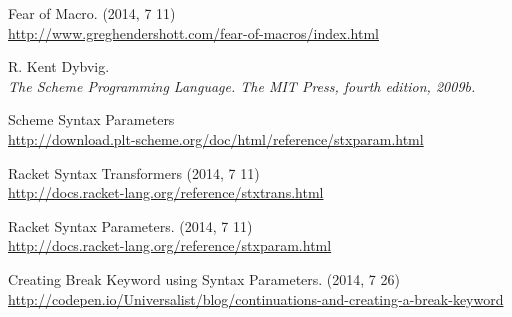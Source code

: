 \begin{thebibliography}{10}
 Fear of Macro. (2014, 7 11)\\
\url{http://www.greghendershott.com/fear-of-macros/index.html}

 R. Kent Dybvig.\\
{\it The Scheme Programming Language. The MIT Press, fourth edition, 2009b.}

 Scheme Syntax Parameters\\
\url{http://download.plt-scheme.org/doc/html/reference/stxparam.html}

 Racket Syntax Transformers (2014, 7 11)\\
\url{http://docs.racket-lang.org/reference/stxtrans.html}

 Racket Syntax Parameters. (2014, 7 11)\\
\url{http://docs.racket-lang.org/reference/stxparam.html}

 Creating Break Keyword using Syntax Parameters. (2014, 7 26)\\
\url{http://codepen.io/Universalist/blog/continuations-and-creating-a-break-keyword}


\end{thebibliography}
